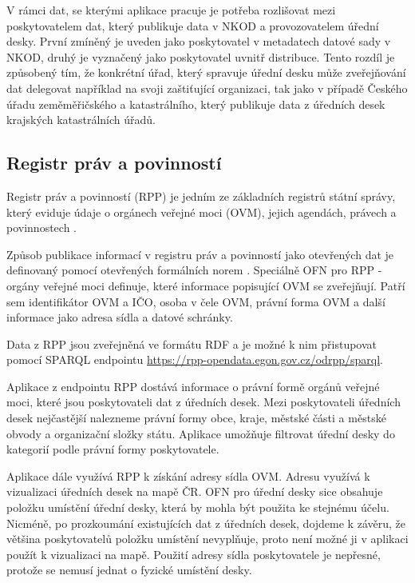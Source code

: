 V rámci dat, se kterými aplikace pracuje je potřeba rozlišovat mezi poskytovatelem dat, který publikuje data v NKOD a provozovatelem úřední desky. První zmíněný je uveden jako poskytovatel v metadatech datové sady v NKOD, druhý je vyznačený jako poskytovatel uvnitř distribuce. Tento rozdíl je způsobený tím, že konkrétní úřad, který spravuje úřední desku může zveřejňování dat delegovat například na svoji zaštiťující organizaci, tak jako v případě Českého úřadu zeměměřičského a katastrálního, který publikuje data z úředních desek krajských katastrálních úřadů. 

\subsection{Registr práv a povinností}\label{subsec:rpp}

Registr práv a povinností (RPP) je jedním ze základních registrů státní správy, který eviduje údaje o orgánech veřejné moci (OVM), jejich agendách, právech a povinnostech \cite{RPP-about}.

Způsob publikace informací v registru práv a povinností jako otevřených dat je definovaný pomocí otevřených formálních norem \cite{OFN-RPP}. Speciálně OFN pro RPP - orgány veřejné moci \cite{OFN-RPP-OVM} definuje, které informace popisující OVM se zveřejňují. Patří sem identifikátor OVM a IČO, osoba v čele OVM, právní forma OVM a další informace jako adresa sídla a datové schránky.

Data z RPP jsou zveřejněná ve formátu RDF a je možné k nim přistupovat pomocí SPARQL endpointu \url{https://rpp-opendata.egon.gov.cz/odrpp/sparql}.

Aplikace z endpointu RPP dostává informace o právní formě orgánů veřejné moci, které jsou poskytovateli dat z úředních desek. Mezi poskytovateli úředních desek nejčastější nalezneme právní formy obce, kraje, městské části a městské obvody a organizační složky státu. Aplikace umožňuje filtrovat úřední desky do kategorií podle právní formy poskytovatele.

Aplikace dále využívá RPP k získání adresy sídla OVM. Adresu využívá k vizualizaci úředních desek na mapě ČR. OFN pro úřední desky sice obsahuje položku umístění úřední desky, která by mohla být použita ke stejnému účelu. Nicméně, po prozkoumání existujících dat z úředních desek, dojdeme k závěru, že většina poskytovatelů položku umístění nevyplňuje, proto není možné ji v aplikaci použít k vizualizaci na mapě. Použití adresy sídla poskytovatele je nepřesné, protože se nemusí jednat o fyzické umístění desky.

